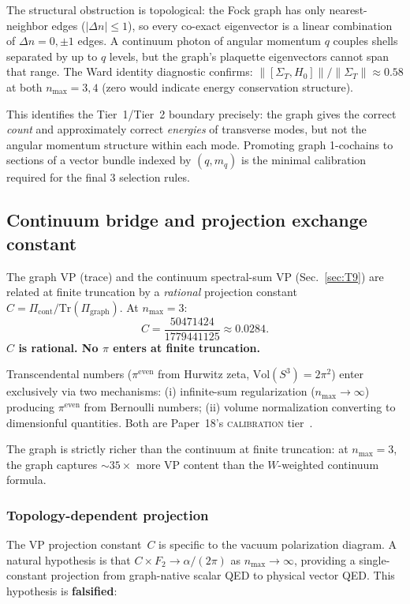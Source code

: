 \documentclass[11pt]{article}
\begin{document}
The structural obstruction is topological: the Fock graph has only
nearest-neighbor edges ($|\Delta n| \leq 1$), so every co-exact
eigenvector is a linear combination of $\Delta n = 0, \pm 1$ edges.
A continuum photon of angular momentum $q$ couples shells separated by
up to $q$ levels, but the graph's plaquette eigenvectors cannot span
that range.  The Ward identity diagnostic confirms: $\|[\Sigma_T, H_0]\|
/ \|\Sigma_T\| \approx 0.58$ at both $n_{\max} = 3, 4$ (zero would
indicate energy conservation structure).

This identifies the Tier~1/Tier~2 boundary precisely: the graph gives the
correct \emph{count} and approximately correct \emph{energies} of transverse
modes, but not the angular momentum structure within each mode.  Promoting
graph 1-cochains to sections of a vector bundle indexed by $(q, m_q)$ is
the minimal calibration required for the final 3 selection rules.

\subsection{Continuum bridge and projection exchange constant}
\label{sec:continuum_bridge}

The graph VP (trace) and the continuum spectral-sum VP
(Sec.~\ref{sec:T9}) are related at finite truncation by a
\emph{rational} projection constant
$C = \Pi_{\mathrm{cont}} / \mathrm{Tr}(\Pi_{\mathrm{graph}})$.
At $n_{\max} = 3$:
\[
  C = \frac{50471424}{1779441125} \approx 0.0284.
\]
\textbf{$C$ is rational.  No $\pi$ enters at finite truncation.}

Transcendental numbers ($\pi^{\mathrm{even}}$ from Hurwitz zeta,
$\mathrm{Vol}(S^3) = 2\pi^2$) enter exclusively via two mechanisms:
(i) infinite-sum regularization ($n_{\max} \to \infty$) producing
$\pi^{\mathrm{even}}$ from Bernoulli numbers; (ii) volume normalization
converting to dimensionful quantities.  Both are Paper~18's
\textsc{calibration} tier~\cite{paper18}.

The graph is strictly richer than the continuum at finite truncation:
at $n_{\max} = 3$, the graph captures ${\sim}35\times$ more VP content
than the $W$-weighted continuum formula.

\subsubsection{Topology-dependent projection}
\label{sec:topology_dependent_projection}

The VP projection constant~$C$ is specific to the vacuum polarization
diagram.  A natural hypothesis is that $C \times F_2 \to \alpha/(2\pi)$
as $n_{\max} \to \infty$, providing a single-constant projection from
graph-native scalar QED to physical vector QED.  This hypothesis is
\textbf{falsified}:
\end{document}

